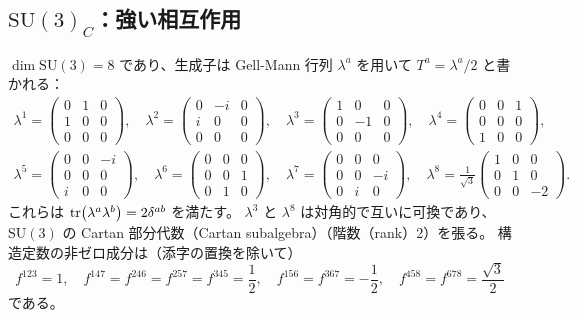 \documentclass[uplatex,dvipdfmx,a4paper,11pt,openany]{jsbook}
\newcommand{\en}[1]{（#1）}
\numberwithin{equation}{chapter}
\theoremstyle{definition}
\theoremstyle{plain}
\theoremstyle{remark}
\newcommand{\SU}{\mathrm{SU}}
\begin{document}
\subsection{$\SU(3)_C$：強い相互作用}
$\dim\SU(3)=8$ であり、生成子は Gell-Mann 行列 $\lambda^a$ を用いて $T^a=\lambda^a/2$ と書かれる：
\begin{gather}
\lambda^1=\begin{pmatrix}0&1&0\\1&0&0\\0&0&0\end{pmatrix},\quad
\lambda^2=\begin{pmatrix}0&-i&0\\i&0&0\\0&0&0\end{pmatrix},\quad
\lambda^3=\begin{pmatrix}1&0&0\\0&-1&0\\0&0&0\end{pmatrix},\quad
\lambda^4=\begin{pmatrix}0&0&1\\0&0&0\\1&0&0\end{pmatrix},\\
\lambda^5=\begin{pmatrix}0&0&-i\\0&0&0\\i&0&0\end{pmatrix},\quad
\lambda^6=\begin{pmatrix}0&0&0\\0&0&1\\0&1&0\end{pmatrix},\quad
\lambda^7=\begin{pmatrix}0&0&0\\0&0&-i\\0&i&0\end{pmatrix},\quad
\lambda^8=\frac{1}{\sqrt3}\begin{pmatrix}1&0&0\\0&1&0\\0&0&-2\end{pmatrix}.
\end{gather}
これらは $\tr(\lambda^a\lambda^b)=2\delta^{ab}$ を満たす。
$\lambda^3$ と $\lambda^8$ は対角的で互いに可換であり、
$\SU(3)$ の Cartan 部分代数\en{Cartan subalgebra}（階数\en{rank}2）を張る。
構造定数の非ゼロ成分は（添字の置換を除いて）
\begin{equation}
f^{123}=1,\quad
f^{147}=f^{246}=f^{257}=f^{345}=\frac12,\quad
f^{156}=f^{367}=-\frac12,\quad
f^{458}=f^{678}=\frac{\sqrt3}{2}
\end{equation}
である。
\end{document}
